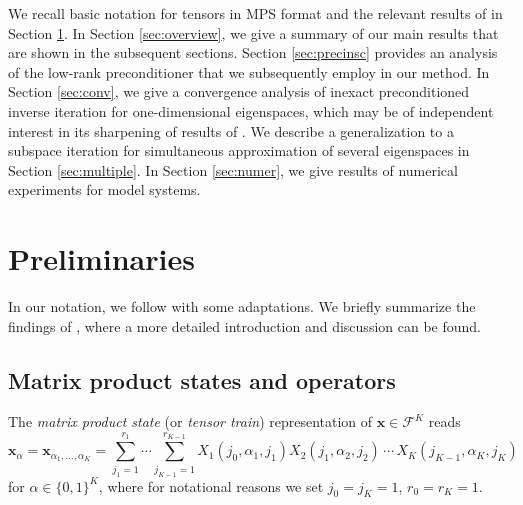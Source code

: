 \documentclass[a4paper,11pt,oneside]{amsart}
\theoremstyle{definition}
\theoremstyle{remark}
\newcommand{\cF}{{\mathcal{F}}}
\newcommand{\ten}[1]{\boldsymbol{#1}}
\numberwithin{equation}{section}
\numberwithin{theorem}{section}
\begin{document}
We recall basic notation for tensors in MPS format and the relevant results of \cite{BGP:22} in Section \ref{sec:prelim}.
In Section \ref{sec:overview}, we give a summary of our main results that are shown in the subsequent sections.
Section \ref{sec:precinsc} provides an analysis of the low-rank preconditioner that we subsequently employ in our method.
In Section \ref{sec:conv}, we give a convergence analysis of inexact preconditioned inverse iteration for one-dimensional eigenspaces, which may be of independent interest in its sharpening of results of \cite{Rohwedder:11}.
We describe a generalization to a subspace iteration for simultaneous approximation of several eigenspaces in Section \ref{sec:multiple}.
In Section \ref{sec:numer}, we give results of numerical experiments for model systems.

\section{Preliminaries}\label{sec:prelim}

%
In our notation, we follow \cite{kazeev_low-rank_2012,BK:20} with some adaptations. We briefly summarize the findings of \cite{BGP:22}, where a more detailed introduction and discussion can be found.

\subsection{Matrix product states and operators}\label{sec:MPS}

The \emph{matrix product state} (or \emph{tensor train}) representation of $\ten{x} \in \cF^K$ reads
\begin{equation} \label{eq:mps}
\ten{x}_\alpha = \ten{x}_{\alpha_1, \ldots, \alpha_K} =
		\sum_{j_1=1}^{r_1}
		\cdots
		\sum_{j_{K-1}=1}^{r_{K-1}}
		X_1(j_0, \alpha_1, j_1)
		X_2(j_1, \alpha_2, j_2)
		\, \cdots \,
		X_K(j_{K-1}, \alpha_K, j_K)
\end{equation}
for $\alpha \in \{0,1\}^K$, where for notational reasons we set $j_0 = j_K = 1$, $r_0 = r_K = 1$.

%
\end{document}
